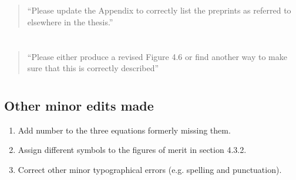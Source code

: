 \documentclass[a4paper,11pt]{article}
\begin{document}
\section{}
\begin{quote}
  ``Please update the Appendix to correctly list the preprints as
  referred to elsewhere in the thesis.''
\end{quote}

\section{}
\begin{quote}
  ``Please either produce a revised Figure 4.6 or find another way to
  make sure that this is correctly described''
\end{quote}

\section{}
\subsection*{Other minor edits made}
\begin{enumerate}
  \item Add number to the three equations formerly missing them.
  \item Assign different symbols to the figures of merit in section 4.3.2.
  \item Correct other minor typographical errors (e.g. spelling and
        punctuation).
\end{enumerate}
\end{document}
